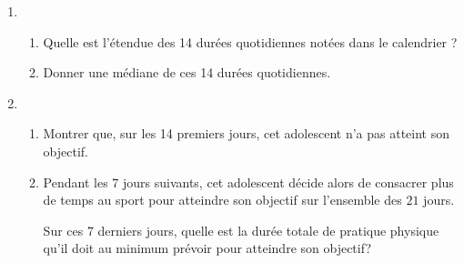 \begin{enumerate}[resume]
\item
	\begin{enumerate}
		\item Quelle est l'étendue des 14 durées quotidiennes notées dans le calendrier ?
		\item Donner une médiane de ces 14 durées quotidiennes.
	\end{enumerate}
\item
	\begin{enumerate}
		\item Montrer que, sur les 14 premiers jours, cet adolescent n'a pas atteint son objectif.
		\item  Pendant les 7 jours suivants, cet adolescent décide alors de consacrer plus de temps au sport pour atteindre son objectif sur l'ensemble des $21$ jours.

Sur ces 7 derniers jours, quelle est la durée totale de pratique physique qu'il doit au minimum prévoir pour atteindre son objectif?
	\end{enumerate}
\end{enumerate}

\bigskip

